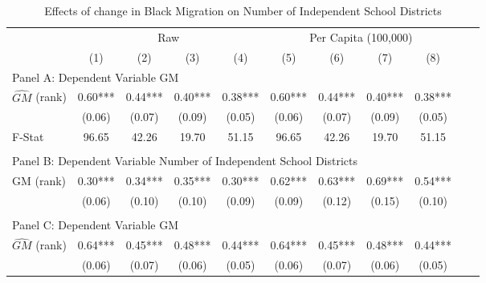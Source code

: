  \begin{table}[htbp]\centering {} \begin{threeparttable} \caption{Effects of change in Black Migration on Number of Independent School Districts} \begin{tabular}{l*{10}{c}} \toprule
                &\multicolumn{4}{c}{Raw}                                    &\multicolumn{4}{c}{Per Capita (100,000)}                   \\\cmidrule(lr){2-5}\cmidrule(lr){6-9}
                &\multicolumn{1}{c}{(1)}   &\multicolumn{1}{c}{(2)}   &\multicolumn{1}{c}{(3)}   &\multicolumn{1}{c}{(4)}   &\multicolumn{1}{c}{(5)}   &\multicolumn{1}{c}{(6)}   &\multicolumn{1}{c}{(7)}   &\multicolumn{1}{c}{(8)}   \\
\cmidrule(lr){1-9}
\multicolumn{8}{l}{Panel A: Dependent Variable GM}\\
\cmidrule(lr){1-9}
$\hat{GM}$ (rank)&       0.60***&       0.44***&       0.40***&       0.38***&       0.60***&       0.44***&       0.40***&       0.38***\\
                &     (0.06)   &     (0.07)   &     (0.09)   &     (0.05)   &     (0.06)   &     (0.07)   &     (0.09)   &     (0.05)   \\
\midrule
F-Stat          &      96.65   &      42.26   &      19.70   &      51.15   &      96.65   &      42.26   &      19.70   &      51.15   \\
\cmidrule[\heavyrulewidth](lr){1-9} \\ \cmidrule[\heavyrulewidth](lr){1-9}
\multicolumn{8}{l}{Panel B: Dependent Variable Number of Independent School Districts}\\
\cmidrule(lr){1-9}
GM  (rank)      &       0.30***&       0.34***&       0.35***&       0.30***&       0.62***&       0.63***&       0.69***&       0.54***\\
                &     (0.06)   &     (0.10)   &     (0.10)   &     (0.09)   &     (0.09)   &     (0.12)   &     (0.15)   &     (0.10)   \\
\cmidrule[\heavyrulewidth](lr){1-9} \\ \cmidrule[\heavyrulewidth](lr){1-9}
\multicolumn{8}{l}{Panel C: Dependent Variable GM}\\
\cmidrule(lr){1-9}
$\hat{GM}$ (rank)&       0.64***&       0.45***&       0.48***&       0.44***&       0.64***&       0.45***&       0.48***&       0.44***\\
                &     (0.06)   &     (0.07)   &     (0.06)   &     (0.05)   &     (0.06)   &     (0.07)   &     (0.06)   &     (0.05)   \\

\end{tabular}
\end{threeparttable}
\end{table}
